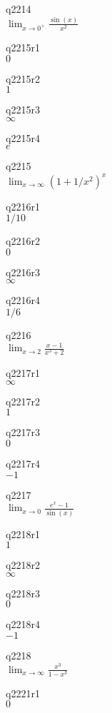 q2214\\
\(\displaystyle \lim_{x \rightarrow 0^+} \frac{\sin(x)}{x^2} \)

q2215r1\\
\(\displaystyle 0 \)

q2215r2\\
\(\displaystyle 1 \)

q2215r3\\
\(\displaystyle \infty \)

q2215r4\\
\(\displaystyle e \)

q2215\\
\(\displaystyle \lim_{x \rightarrow \infty} (1+1/x^2)^x \)

q2216r1\\
\(\displaystyle 1/10 \)

q2216r2\\
\(\displaystyle 0 \)

q2216r3\\
\(\displaystyle \infty \)

q2216r4\\
\(\displaystyle 1/6 \)

q2216\\
\(\displaystyle \lim_{x \rightarrow 2} \frac{x-1}{x^3+2} \)

q2217r1\\
\(\displaystyle \infty \)

q2217r2\\
\(\displaystyle 1 \)

q2217r3\\
\(\displaystyle 0 \)

q2217r4\\
\(\displaystyle -1 \)

q2217\\
\(\displaystyle \lim_{x \rightarrow 0} \frac{e^x - 1}{\sin(x)} \)

q2218r1\\
\(\displaystyle 1 \)

q2218r2\\
\(\displaystyle \infty \)

q2218r3\\
\(\displaystyle 0 \)

q2218r4\\
\(\displaystyle -1 \)

q2218\\
\(\displaystyle \lim_{x \rightarrow \infty} \frac{x^3}{1-x^3} \)

q2221r1\\
\(\displaystyle 0 \)

